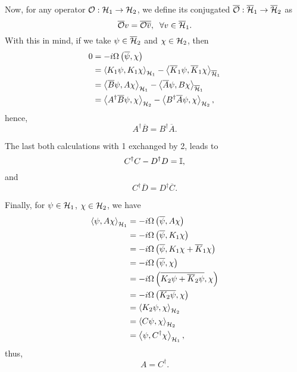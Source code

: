 Now, for any operator \({\mathcal{O}}:{\mathcal{H}}_1\to{\mathcal{H}}_2\), we define its conjugated \(\overline{{\mathcal{O}}}:\overline{{\mathcal{H}}}_1\to\overline{{\mathcal{H}}}_2\) as
\begin{equation}
    \overline{{\mathcal{O}}}v=\overline{{\mathcal{O}}\overline{v}},\;\;\forall v\in\overline{{\mathcal{H}}}_1.
\end{equation}
With this in mind, if we take \(\psi\in\overline{{\mathcal{H}}}_2\) and \(\chi\in{\mathcal{H}}_2\), then
\begin{subequations}
    \begin{align}
        0&=-i\Omega\left(\overline{\psi},\chi\right)\\
        &=\left\langle K_1\psi, K_1\chi\right\rangle_{{\mathcal{H}}_1}-\left\langle \overline{K}_1\psi, \overline{K}_1\chi\right\rangle_{\overline{{\mathcal{H}}}_1}\\
        &=\left\langle \overline{B}\psi, A\chi\right\rangle_{{\mathcal{H}}_1}-\left\langle \overline{A}\psi, B\chi\right\rangle_{\overline{{\mathcal{H}}}_1}\\
        &=\left\langle A^\dagger\overline{B}\psi, \chi\right\rangle_{{\mathcal{H}}_2}-\left\langle B^{\dagger}\overline{A}\psi, \chi\right\rangle_{{\mathcal{H}}_2},
    \end{align}
\end{subequations}
hence,
\begin{equation}\label{eq:condAB2}
    A^{\dagger}\overline{B}=B^{\dagger}\overline{A}.
\end{equation}

The last both calculations with 1 exchanged by 2, leads to
\begin{equation}\label{eq:condCD1}
    C^{\dagger}C-D^{\dagger}D={\mathbb{I}},
\end{equation}
and
\begin{equation}\label{eq:condCD2}
    C^{\dagger}\overline{D}=D^{\dagger}\overline{C}.
\end{equation}

Finally, for \(\psi\in{\mathcal{H}}_1\), \(\chi\in{\mathcal{H}}_2\), we have
\begin{subequations}
    \begin{align}
        \left\langle \psi, A\chi\right\rangle_{{\mathcal{H}}_1}&=-i\Omega\left(\overline{\psi},A\chi\right)\\
        &=-i\Omega\left(\overline{\psi},K_1\chi\right)\\
        &=-i\Omega\left(\overline{\psi},K_1\chi+\overline{K}_1\chi\right)\\
        &=-i\Omega\left(\overline{\psi},\chi\right)\\
        &=-i\Omega\left(\overline{K_2\psi+\overline{K}_2\psi},\chi\right)\\
        &=-i\Omega\left(\overline{K_2\psi},\chi\right)\\
        &=\left\langle K_2\psi, \chi\right\rangle_{{\mathcal{H}}_2}\\
        &=\left\langle C\psi, \chi\right\rangle_{{\mathcal{H}}_2}\\
        &=\left\langle \psi, C^{\dagger}\chi\right\rangle_{{\mathcal{H}}_1},
    \end{align}
\end{subequations}
thus,
\begin{equation}\label{eq:condAC}
    A=C^\dagger.
\end{equation}

